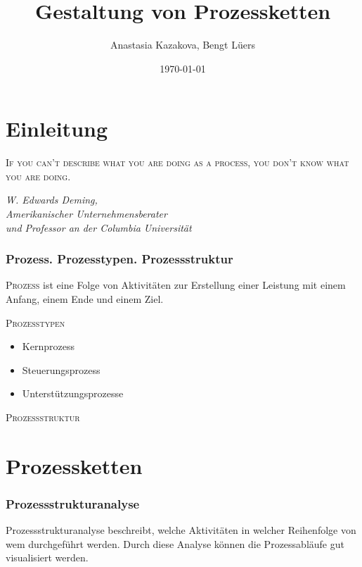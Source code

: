 \documentclass{beamer}
\title{Gestaltung von Prozessketten}
\author[A. Kazakova, B. Lüers]{Anastasia Kazakova, Bengt Lüers}
\institute[Universität Oldenburg]{
  \inst{}Fakultät 2 - Informatik, Wirtschafts- und Rechtswissenschaften}
\date{\today}
\begin{document}
 \frame{\titlepage}


 \section[Einleitung]{Einleitung}
 
 \begin{frame}
 
 
 \textsc{\flqq If you can't describe what you are doing as a process, you don't know what you are doing.\frqq} 
 \\
 \medskip 
 \begin{flushright}
	 \begin{small}
		\emph{\textit{W. Edwards Deming, \\
 				Amerikanischer Unternehmensberater \\
				und Professor an der Columbia Universität}}
	\end{small}
 \end{flushright}
 
 \end{frame}
 
 \begin{frame}
  \frametitle{Prozess. Prozesstypen. Prozessstruktur}
  
  \textsc{Prozess} ist eine Folge von Aktivitäten zur Erstellung einer Leistung mit einem Anfang, einem Ende und einem Ziel.

\bigskip 
  \textsc{Prozesstypen}\\
  \begin{itemize}
  	\item Kernprozess
  	\item Steuerungsprozess
  	\item Unterstützungsprozesse
  \end{itemize}

\bigskip

\textsc{Prozessstruktur}
 
\end{frame}




 \section[Prozessketten]{Prozessketten}
 \begin{frame}
  \frametitle{Prozessstrukturanalyse}
  
  Prozessstrukturanalyse beschreibt, welche Aktivitäten in welcher Reihenfolge von wem durchgeführt werden. Durch diese Analyse können die Prozessabläufe gut visualisiert werden. \\
    \end{frame}
\end{document}
